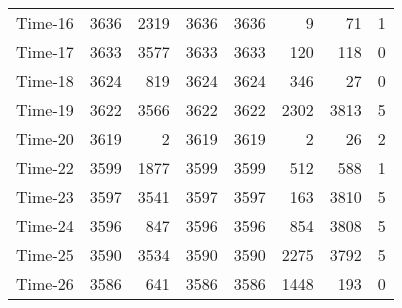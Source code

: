 \begin{footnotesize}
\begin{longtable}{lrrrrrrc}
Time-16 &  3636 & 2319 & 3636 & 3636 & 9  & 71 & 1\\
Time-17 &  3633 & 3577 & 3633 & 3633 & 120  & 118 & 0\\
Time-18 &  3624 & 819 & 3624 & 3624 & 346  & 27 & 0\\
Time-19 &  3622 & 3566 & 3622 & 3622 & 2302  & 3813 & 5\\
Time-20 &  3619 & 2 & 3619 & 3619 & 2  & 26 & 2\\
Time-22 &  3599 & 1877 & 3599 & 3599 & 512  & 588 & 1\\
Time-23 &  3597 & 3541 & 3597 & 3597 & 163  & 3810 & 5\\
Time-24 &  3596 & 847 & 3596 & 3596 & 854  & 3808 & 5\\
Time-25 &  3590 & 3534 & 3590 & 3590 & 2275  & 3792 & 5\\
Time-26 &  3586 & 641 & 3586 & 3586 & 1448  & 193 & 0\\
\bottomrule
\end{longtable}
\end{footnotesize}
